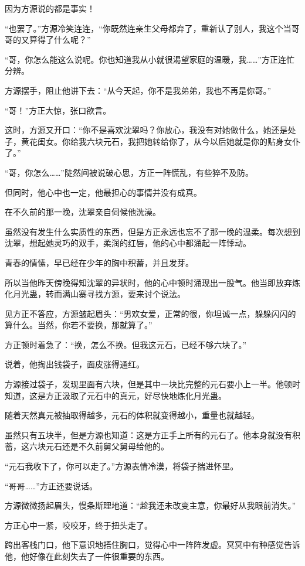 \begin{this_body}
因为方源说的都是事实！

“也罢了。”方源冷笑连连，“你既然连亲生父母都弃了，重新认了别人，我这个当哥哥的又算得了什么呢？”

“哥，你怎么能这么说呢。你也知道我从小就很渴望家庭的温暖，我……”方正连忙分辨。

方源摆手，阻止他讲下去：“从今天起，你不是我弟弟，我也不再是你哥。”

“哥！”方正大惊，张口欲言。

这时，方源又开口：“你不是喜欢沈翠吗？你放心，我没有对她做什么，她还是处子，黄花闺女。你给我六块元石，我把她转给你了，从今以后她就是你的贴身女仆了。”

“哥，你怎么……”陡然间被说破心思，方正一阵慌乱，有些猝不及防。

但同时，他心中也一定，他最担心的事情并没有成真。

在不久前的那一晚，沈翠亲自伺候他洗澡。

虽然没有发生什么实质性的东西，但是方正永远也忘不了那一晚的温柔。每次想到沈翠，想起她灵巧的双手，柔润的红唇，他的心中都涌起一阵悸动。

青春的情愫，早已经在少年的胸中积蓄，并且发芽。

所以当他昨天傍晚得知沈翠的异状时，他的心中顿时涌现出一股气。他当即放弃炼化月光蛊，转而满山寨寻找方源，要来讨个说法。

见方正不答应，方源皱起眉头：“男欢女爱，正常的很，你坦诚一点，躲躲闪闪的算什么。当然，你若不要换，那就算了。”

方正顿时着急了：“换，怎么不换。但我这元石，已经不够六块了。”

说着，他掏出钱袋子，面皮涨得通红。

方源接过袋子，发现里面有六块，但是其中一块比完整的元石要小上一半。他顿时知道，这是方正汲取了元石中的真元，好尽快地炼化月光蛊。

随着天然真元被抽取得越多，元石的体积就变得越小，重量也就越轻。

虽然只有五块半，但是方源也知道：这是方正手上所有的元石了。他本身就没有积蓄，这六块元石还是不久前舅父舅母给他的。

“元石我收下了，你可以走了。”方源表情冷漠，将袋子揣进怀里。

“哥哥……”方正还要说话。

方源微微扬起眉头，慢条斯理地道：“趁我还未改变主意，你最好从我眼前消失。”

方正心中一紧，咬咬牙，终于扭头走了。

跨出客栈门口，他下意识地捂住胸口，觉得心中一阵阵发虚。冥冥中有种感觉告诉他，他好像在此刻失去了一件很重要的东西。


\end{this_body}
